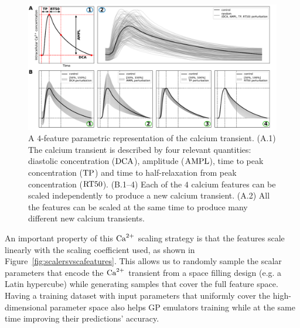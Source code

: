 \begin{figure}[!ht]
    \myfloatalign
    \includegraphics[width=\textwidth]{figures/chapter06/ca_biomarkers_and_scaling_explained_with_labels.pdf}
    \caption{A $4$-feature parametric representation of the calcium transient. (A.1) The calcium transient is described by four relevant quantities: diastolic concentration ($\textrm{DCA}$), amplitude ($\textrm{AMPL}$), time to peak concentration ($\textrm{TP}$) and time to half-relaxation from peak concentration ($\textrm{RT50}$). (B.1--4) Each of the $4$ calcium features can be scaled independently to produce a new calcium transient. (A.2) All the features can be scaled at the same time to produce many different new calcium transients.}
    \label{fig:algintopractice}
\end{figure}

\vspace{0.2cm}
An important property of this $\textrm{Ca}^{2+}$ scaling strategy is that the features scale linearly with the scaling coefficient used, as shown in Figure~\ref{fig:scalersvscafeatures}. This allows us to randomly sample the scalar parameters that encode the $\textrm{Ca}^{2+}$ transient from a space filling design (e.g. a Latin hypercube) while generating samples that cover the full feature space. Having a training dataset with input parameters that uniformly cover the high-dimensional parameter space also helps GP emulators training while at the same time improving their predictions' accuracy.

